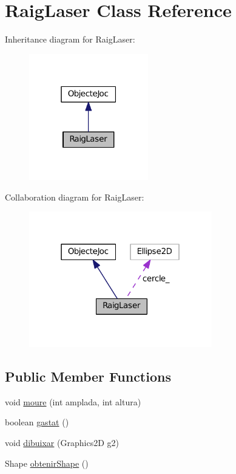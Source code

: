 \hypertarget{class_raig_laser}{}\section{Raig\+Laser Class Reference}
\label{class_raig_laser}


Inheritance diagram for Raig\+Laser\+:\nopagebreak
\begin{figure}[H]
\begin{center}
\leavevmode
\includegraphics[width=147pt]{class_raig_laser__inherit__graph}
\end{center}
\end{figure}


Collaboration diagram for Raig\+Laser\+:\nopagebreak
\begin{figure}[H]
\begin{center}
\leavevmode
\includegraphics[width=226pt]{class_raig_laser__coll__graph}
\end{center}
\end{figure}
\subsection*{Public Member Functions}
\begin{DoxyCompactItemize}
\item 
void \hyperlink{class_raig_laser_af35092ef77217fb1aa4ff956cc5dfa55}{moure} (int amplada, int altura)
\item 
boolean \hyperlink{class_raig_laser_a66023f2dfc49d5b4ff859804736c090e}{gastat} ()
\item 
void \hyperlink{class_raig_laser_ac5b68f8063e239ae947a7ed728614799}{dibuixar} (Graphics2\+D g2)
\item 
Shape \hyperlink{class_raig_laser_abcf16e8249b1e7562d6fbcc6d408e7f4}{obtenir\+Shape} ()
\end{DoxyCompactItemize}
